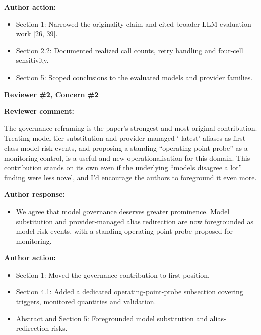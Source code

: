 \documentclass[11pt]{article}
\newcommand{\rvcomment}[1]{{\color{ReviewerGreen}#1}}
\newcommand{\concern}[1]{\textbf{\color{ReviewerGreen}#1}}
\begin{document}
\textbf{Author action:}

\begin{itemize}

\item Section 1: Narrowed the originality claim and cited broader LLM-evaluation work [26, 39].

\item Section 2.2: Documented realized call counts, retry handling and four-cell sensitivity.

\item Section 5: Scoped conclusions to the evaluated models and provider families.

\end{itemize}

\vspace{12pt}
\concern{Reviewer \#2, Concern \#2}

\concern{Reviewer comment:}

\rvcomment{The governance reframing is the paper's strongest and most original contribution. Treating model-tier substitution and provider-managed `-latest' aliases as first-class model-risk events, and proposing a standing ``operating-point probe'' as a monitoring control, is a useful and new operationalisation for this domain. This contribution stands on its own even if the underlying ``models disagree a lot'' finding were less novel, and I'd encourage the authors to foreground it even more.}

\textbf{Author response:}

\begin{itemize}

\item We agree that model governance deserves greater prominence. Model substitution and provider-managed alias redirection are now foregrounded as model-risk events, with a standing operating-point probe proposed for monitoring.

\end{itemize}

\textbf{Author action:}

\begin{itemize}

\item Section 1: Moved the governance contribution to first position.

\item Section 4.1: Added a dedicated operating-point-probe subsection covering triggers, monitored quantities and validation.

\item Abstract and Section 5: Foregrounded model substitution and alias-redirection risks.

\end{itemize}
\end{document}
